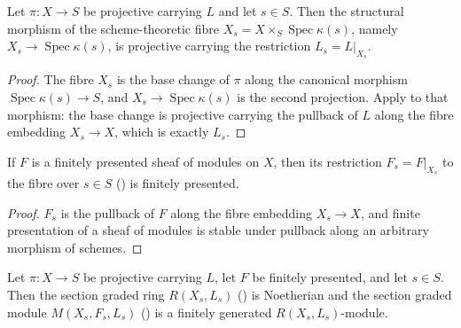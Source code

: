 \begin{lemma}
  \label{lem:projective_with_fiber}
  \leanok
  Let \(\pi : X \to S\) be projective carrying \(L\) and let \(s \in S\).  Then
  the structural morphism of the scheme-theoretic fibre
  \(X_s = X \times_S \operatorname{Spec}\kappa(s)\), namely
  \(X_s \to \operatorname{Spec}\kappa(s)\), is projective carrying the
  restriction \(L_s = L|_{X_s}\).
\end{lemma}

\begin{proof}
  \leanok
  The fibre \(X_s\) is the base change of \(\pi\) along the canonical morphism
  \(\operatorname{Spec}\kappa(s) \to S\), and \(X_s \to
  \operatorname{Spec}\kappa(s)\) is the second projection.  Apply
   to that morphism: the base change is
  projective carrying the pullback of \(L\) along the fibre embedding
  \(X_s \to X\), which is exactly \(L_s\).
\end{proof}

\begin{lemma}
  \label{lem:fiberModule_finitePresentation}
  \leanok
  If \(F\) is a finitely presented sheaf of modules on \(X\), then its
  restriction \(F_s = F|_{X_s}\) to the fibre over \(s \in S\)
  () is finitely presented.
\end{lemma}

\begin{proof}
  \leanok
  \(F_s\) is the pullback of \(F\) along the fibre embedding \(X_s \to X\), and
  finite presentation of a sheaf of modules is stable under pullback along an
  arbitrary morphism of schemes.
\end{proof}

\begin{lemma}
  \label{lem:sectionGradedModule_fg_fiber}
  \leanok
  Let \(\pi : X \to S\) be projective carrying \(L\), let \(F\) be finitely
  presented, and let \(s \in S\).  Then the section graded ring \(R(X_s, L_s)\)
  () is Noetherian and the section graded module
  \(M(X_s, F_s, L_s)\) () is a finitely generated
  \(R(X_s, L_s)\)-module.
\end{lemma}

